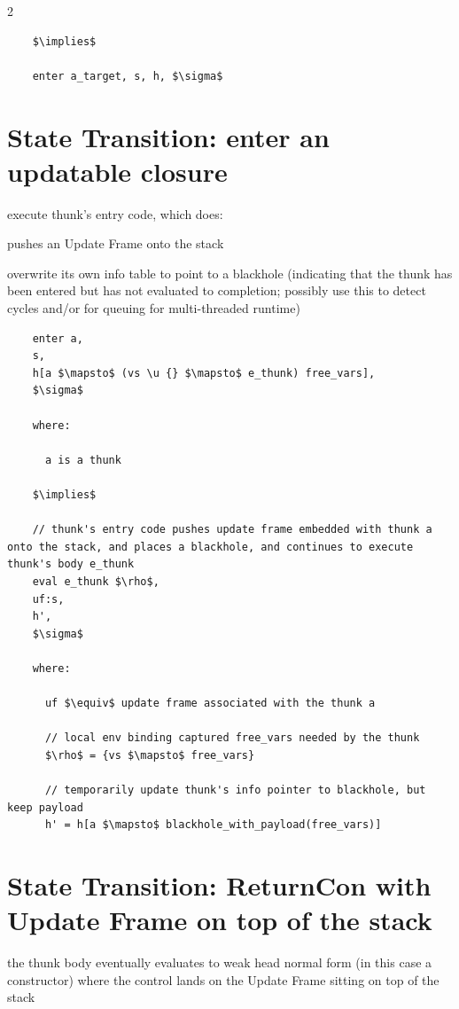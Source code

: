 \documentclass[8pt]{extarticle}
\begin{document}
\begin{multicols*}{2}
\begin{lstlisting}
    $\implies$

    enter a_target, s, h, $\sigma$
  \end{lstlisting}

  \vfill\null
  \columnbreak

  \section{State Transition: enter an updatable closure}

  execute thunk's entry code, which does:

  pushes an Update Frame onto the stack

  overwrite its own info table to point to a blackhole (indicating that the thunk has been entered but has not evaluated to completion; possibly use this to detect cycles and/or for queuing for multi-threaded runtime)

  \begin{lstlisting}
    enter a,
    s,
    h[a $\mapsto$ (vs \u {} $\mapsto$ e_thunk) free_vars],
    $\sigma$

    where:

      a is a thunk

    $\implies$

    // thunk's entry code pushes update frame embedded with thunk a onto the stack, and places a blackhole, and continues to execute thunk's body e_thunk
    eval e_thunk $\rho$,
    uf:s,
    h',
    $\sigma$

    where:

      uf $\equiv$ update frame associated with the thunk a

      // local env binding captured free_vars needed by the thunk
      $\rho$ = {vs $\mapsto$ free_vars}

      // temporarily update thunk's info pointer to blackhole, but keep payload
      h' = h[a $\mapsto$ blackhole_with_payload(free_vars)]

  \end{lstlisting}

  \section{State Transition: ReturnCon with Update Frame on top of the stack}

  the thunk body eventually evaluates to weak head normal form (in this case a constructor) where the control lands on the Update Frame sitting on top of the stack


\end{multicols*}
\end{document}
